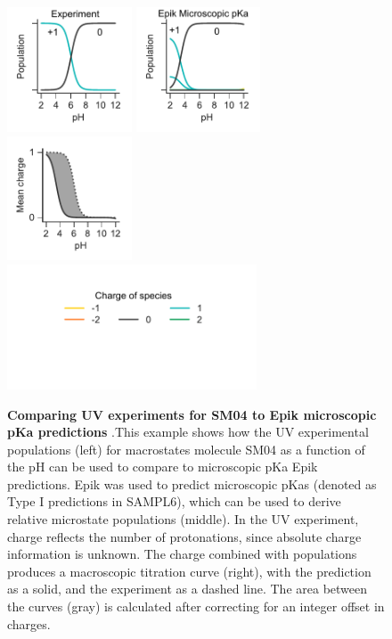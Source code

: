 \documentclass[9pt,lineno,final]{elife}
\begin{document}
\begin{figure}[H]
	\centering
	\includegraphics[width=0.33\textwidth]{Reports/Experiment-populations-SM04-titled.pdf}
	\includegraphics[width=0.33\textwidth]{Reports/Epik-TypeI-populations-SM04-titled.pdf}
	\includegraphics[width=0.33\textwidth]{Reports/Epik-TypeI-virtual-titration-SM04.pdf}\\
	\includegraphics[width=0.66\textwidth, trim={0 2cm 0 1cm},clip]{Reports/overview-charge-legend-2.pdf}
		\caption{{\bf Comparing UV experiments for SM04 to Epik microscopic pKa predictions} .This example shows how the UV experimental populations (left) for macrostates molecule SM04 as a function of the pH can be used to compare to microscopic pKa Epik predictions. Epik was used to predict microscopic pKas (denoted as Type I predictions in SAMPL6), which can be used to derive relative microstate populations (middle). In the UV experiment, charge reflects the number of protonations, since absolute charge information is unknown. The charge combined with populations produces a macroscopic titration curve (right), with the prediction as a solid, and the experiment as a dashed line. The area between the curves (gray) is calculated after correcting for an integer offset in charges.  
	\label{fig:epiki-prediction}}
\end{figure}
\end{document}
